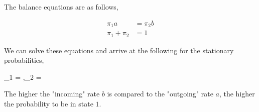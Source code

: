 The balance equations are as follows,

\begin{align*}
\pi_1 a &= \pi_2 b \\
\pi_1 + \pi_2 &= 1
\end{align*}

We can solve these equations and arrive at the following for the stationary probabilities,

\bee
\pi_1 =  ,\quad \pi_2 = 
\eee

The higher the "incoming" rate $b$ is compared to the "outgoing" rate $a$, the higher the probability to be in state $1$.


